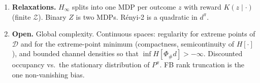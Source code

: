 \documentclass[11pt]{article}
\theoremstyle{remark}
\newcommand{\Zcal}{\mathcal Z}
\newcommand{\Dcal}{\mathcal D}
\newcommand{\1}{\mathds{1}}
\newcommand{\dd}{\mathrm d}
\newcommand{\occ}{d^{\pi}}
\newcommand{\push}{\Phi_{\#}}
\newcommand{\pz}{p_{\pi}}
\newcommand{\Hf}[1]{H\!\left[#1\right]}
\begin{document}
\begin{enumerate}[leftmargin=*,itemsep=2pt]
    Native FB gives the ratio $\dd\pz/\dd\rho_Z$ only, so add a density model for $\rho_Z$.
  \item \textbf{Relaxations.}
    $H_\infty$ splits into one MDP per outcome $z$ with reward $K(z\mid\cdot)$ (finite $\Zcal$).
    Binary $Z$ is two MDPs.
    R\'enyi-2 is a quadratic in $\occ$.
  \item \textbf{Open.}
    Global complexity.
    Continuous spaces: regularity for extreme points of $\Dcal$ and for the extreme-point minimum (compactness, semicontinuity of $\Hf{\cdot}$), and bounded channel densities so that $\inf\Hf{\push d}>-\infty$.
    Discounted occupancy vs.\ the stationary distribution of $P^\pi$.
    FB rank truncation is the one non-vanishing bias.
\end{enumerate}



\end{document}

